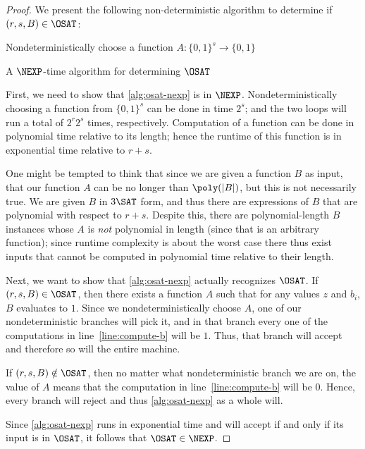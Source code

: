 \documentclass[english,12pt]{reedthesis}
\theoremstyle{plain}
\theoremstyle{definition}
\theoremstyle{remark}
\DeclarePairedDelimiter{\abs}{\lvert}{\rvert}
\begin{document}
\begin{proof}
  We present the following non-deterministic algorithm to determine if
  $(r, s, B) \in \OSAT$:

  \begin{algorithm}[H]
    Nondeterministically choose a function $A\colon \{0, 1\}^{s} \rightarrow \{0, 1\}$\;
    \Accept\;
    \caption{A $\NEXP$-time algorithm for determining $\OSAT$}\label{alg:osat-nexp}
  \end{algorithm}

  First, we need to show that \cref{alg:osat-nexp} is in $\NEXP$.
  Nondeterministically choosing a function from $\{0, 1\}^{s}$ can be done in
  time $2^{s}$; and the two loops will run a total of $2^{r}2^{s}$ times,
  respectively. Computation of a function can be done in polynomial time
  relative to its length; hence the runtime of this function is in exponential
  time relative to $r + s$.

  One might be tempted to think that since we are given a function $B$ as input,
  that our function $A$ can be no longer than $\poly(\abs{B})$, but this is not
  necessarily true. We are given $B$ in $3\SAT$ form, and thus there are
  expressions of $B$ that are polynomial with respect to $r + s$. Despite this,
  there are polynomial-length $B$ instances whose $A$ is \emph{not} polynomial
  in length (since that is an arbitrary function); since runtime complexity is
  about the worst case there thus exist inputs that cannot be computed in
  polynomial time relative to their length.

  Next, we want to show that \cref{alg:osat-nexp} actually recognizes $\OSAT$.
  If $(r, s, B) \in \OSAT$, then there exists a function $A$ such that for any
  values $z$ and $b_{i}$, $B$ evaluates to $1$. Since we nondeterministically
  choose $A$, one of our nondeterministic branches will pick it, and in that
  branch every one of the computations in line~\ref{line:compute-b} will be $1$.
  Thus, that branch will accept and therefore so will the entire machine.

  If $(r, s, B) \notin \OSAT$, then no matter what nondeterministic branch we are on,
  the value of $A$ means that the computation in line~\ref{line:compute-b} will
  be $0$. Hence, every branch will reject and thus \cref{alg:osat-nexp} as a
  whole will.

  Since \cref{alg:osat-nexp} runs in exponential time and will accept if and
  only if its input is in $\OSAT$, it follows that $\OSAT \in \NEXP$.
\end{proof}
\end{document}
